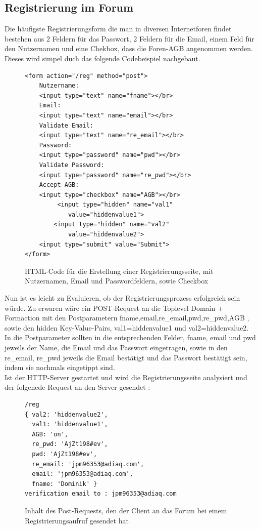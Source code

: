 \subsection{Registrierung im Forum}
Die häufigste Registrierungsform die man in diversen Internetforen findet bestehen aus 2 Feldern für das Passwort, 2 Feldern für die Email, einem Feld für den Nutzernamen und eine Chekbox, dass die Foren-AGB angenommen werden. Dieses wird simpel duch das folgende Codebeispiel nachgebaut.

\begin{figure}[ht]
\begin{lstlisting}[language=HTML5]
<form action="/reg" method="post">
	Nutzername: 
	<input type="text" name="fname"></br>
	Email: 
	<input type="text" name="email"></br>
	Validate Email: 
	<input type="text" name="re_email"></br>
	Password: 
	<input type="password" name="pwd"></br>
	Validate Password: 
	<input type="password" name="re_pwd"></br>
	Accept AGB:
	<input type="checkbox" name="AGB"></br>
 		 <input type="hidden" name="val1" 
            value="hiddenvalue1">
  		<input type="hidden" name="val2" 
            value="hiddenvalue2">
	<input type="submit" value="Submit">
</form>
\end{lstlisting}
\caption{HTML-Code für die Erstellung einer Registrierungsseite, mit Nutzernamen, Email und Passwordfeldern, sowie Checkbox}
\end{figure}
\newpage

Nun ist es leicht zu Evaluieren, ob der Registrierungsprozess erfolgreich sein würde. Zu erwaren wäre ein POST-Request an die Toplevel Domain + Formaction mit den Postparametern fname,email,re\_email,pwd,re\_pwd,AGB , sowie den hidden Key-Value-Pairs, val1=hiddenvalue1 und val2=hiddenvalue2.\\
In die Postparameter sollten in die entsprechenden Felder, fname, email und pwd jeweils der Name, die Email und das Passwort eingetragen, sowie in den re\_email, re\_pwd jeweils die Email bestätigt und das Passwort bestätigt sein, indem sie nochmals eingetippt sind.\\
Ist der HTTP-Server gestartet und wird die Registrierungsseite analysiert und der folgenede Request an den Server gesendet :\\

\begin{figure}[ht]
\begin{lstlisting}[language=HTML5]
/reg
{ val2: 'hiddenvalue2',
  val1: 'hiddenvalue1',
  AGB: 'on',
  re_pwd: 'AjZt198#ev',
  pwd: 'AjZt198#ev',
  re_email: 'jpm96353@adiaq.com',
  email: 'jpm96353@adiaq.com',
  fname: 'Dominik' }
verification email to : jpm96353@adiaq.com
\end{lstlisting}
\caption{Inhalt des Post-Requests, den der Client an das Forum bei einem Registrierungsaufruf gesendet hat}
\end{figure}

